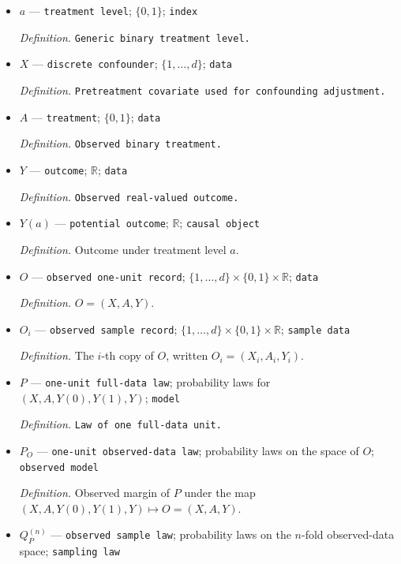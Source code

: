 \documentclass{article}
\begin{document}
\begin{itemize}
  \par\smallskip\noindent\emph{Definition.} \texttt{Generic discrete-\allowbreak{}confounder category.}
  \item \(a\) --- \texttt{treatment level}; \(\{0,1\}\); \texttt{index}
  \par\smallskip\noindent\emph{Definition.} \texttt{Generic binary treatment level.}
  \item \(X\) --- \texttt{discrete confounder}; \(\{1,\ldots,d\}\); \texttt{data}
  \par\smallskip\noindent\emph{Definition.} \texttt{Pretreatment covariate used for confounding adjustment.}
  \item \(A\) --- \texttt{treatment}; \(\{0,1\}\); \texttt{data}
  \par\smallskip\noindent\emph{Definition.} \texttt{Observed binary treatment.}
  \item \(Y\) --- \texttt{outcome}; \(\mathbb R\); \texttt{data}
  \par\smallskip\noindent\emph{Definition.} \texttt{Observed real-\allowbreak{}valued outcome.}
  \item \(Y(a)\) --- \texttt{potential outcome}; \(\mathbb R\); \texttt{causal object}
  \par\smallskip\noindent\emph{Definition.} Outcome under treatment level \(a\).
  \item \(O\) --- \texttt{observed one-\allowbreak{}unit record}; \(\{1,\ldots,d\}\times\{0,1\}\times\mathbb R\); \texttt{data}
  \par\smallskip\noindent\emph{Definition.} \(O=(X,A,Y)\).
  \item \(O_i\) --- \texttt{observed sample record}; \(\{1,\ldots,d\}\times\{0,1\}\times\mathbb R\); \texttt{sample data}
  \par\smallskip\noindent\emph{Definition.} The \(i\)-th copy of \(O\), written \(O_i=(X_i,A_i,Y_i)\).
  \item \(P\) --- \texttt{one-\allowbreak{}unit full-\allowbreak{}data law}; probability laws for \((X,A,Y(0),Y(1),Y)\); \texttt{model}
  \par\smallskip\noindent\emph{Definition.} \texttt{Law of one full-\allowbreak{}data unit.}
  \item \(P_O\) --- \texttt{one-\allowbreak{}unit observed-\allowbreak{}data law}; probability laws on the space of \(O\); \texttt{observed model}
  \par\smallskip\noindent\emph{Definition.} Observed margin of \(P\) under the map \((X,A,Y(0),Y(1),Y)\mapsto O=(X,A,Y)\).
  \item \(Q_P^{(n)}\) --- \texttt{observed sample law}; probability laws on the \(n\)-fold observed-data space; \texttt{sampling law}

\end{itemize}
\end{document}
